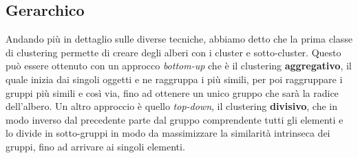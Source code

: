 \documentclass{llncs}
\begin{document}
	\subsection{Gerarchico}
	Andando più in dettaglio sulle diverse tecniche, abbiamo detto che la prima classe di clustering permette di creare degli alberi con i cluster e sotto-cluster. 
	Questo può essere ottenuto con un approcco \textit{bottom-up} che è il clustering \textbf{aggregativo},
	il quale inizia dai singoli oggetti e ne raggruppa i più simili, per poi raggruppare i gruppi più simili e così via, fino ad ottenere un unico gruppo
	che sarà la radice dell'albero. Un altro approccio è quello \textit{top-down}, il clustering \textbf{divisivo}, che in modo inverso dal precedente parte 
	dal gruppo comprendente tutti gli elementi e lo divide in sotto-gruppi in modo da massimizzare la similarità intrinseca dei gruppi, 
	fino ad arrivare ai singoli elementi.
\end{document}
